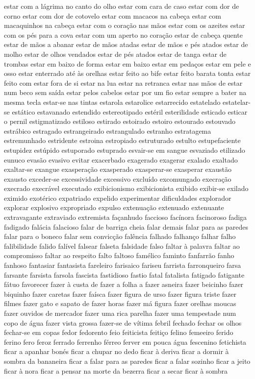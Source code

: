 \begin{appendices}
estar com a l\'{a}grima no canto do olho estar com cara de caso estar com dor de corno estar com dor de cotovelo estar com macacos na cabe\c{c}a estar com macaquinhos na cabe\c{c}a estar com o cora\c{c}\~ao nas m\~aos estar com os azeites estar com os p\'{e}s para a cova estar com um aperto no cora\c{c}\~ao estar de cabe\c{c}a quente estar de m\~aos a abanar estar de m\~aos atadas estar de m\~aos e p\'{e}s atados estar de molho estar de olhos vendados estar de p\'{e}s atados estar de tanga estar de trombas estar em baixo de forma estar em baixo estar em peda\c{c}os estar em pele e osso estar enterrado at\'{e} \`{a}s orelhas estar feito ao bife estar feito barata tonta estar feito com estar fora de si estar na lua estar na retranca estar nas m\~aos de estar num beco sem sa\'{i}da estar pelos cabelos estar por um fio estar sempre a bater na mesma tecla estar-se nas tintas estarola estarolice estarrecido estatelado estatelar-se est\'{a}tico estavanado estendido estereotipado est\'{e}ril esterilidade esticado esticar o pernil estigmatizado estiloso estirado estoirado estoiro estourado estouvado estr\'{a}bico estragado estrangeirado estrangulado estranho estratagema estremunhado estridente estroina estropiado estruturado estulto estupefaciente estupidez est\'{u}pido estuporado estuprado esvair-se em sangue esvaziado etilizado eunuco evas\~ao evasivo evitar exacerbado exagerado exagerar exalado exaltado exaltar-se exangue exaspera\c{c}\~ao exasperado exasperar-se exasperar exaust\~ao exausto exceder-se excessividade excessivo exclu\'{i}do excomungado execra\c{c}\~ao execrado execr\'{a}vel executado exibicionismo exibicionista exibido exibir-se exilado eximido exot\'{e}rico expatriado expelido experimentar dificuldades explorador explorar explosivo expropriado expulso extenua\c{c}\~ao extenuado extenuante extravagante extraviado extremista fa\c{c}anhudo faccioso fac\'{i}nora facinoroso fadiga fadigado fal\'{a}cia falacioso falar de barriga cheia falar demais falar para as paredes falar para o boneco falar sem convic\c{c}\~ao fal\^{e}ncia falhado falhan\c{c}o falhar falho falibilidade falido fal\'{i}vel falsear falseta falsidade falso faltar \`{a} palavra faltar ao compromisso faltar ao respeito falto faltoso fam\'{e}lico faminto fanfarr\~ao fanho fanhoso fantasiar fantasista fareleiro farisaico fariseu farrista farronqueiro farsa farsante farsista farsola fascista fastidioso fastio fatal fatalista fatigado fatigante f\'{a}tuo favorecer fazer \`{a} custa de fazer a folha a fazer asneira fazer beicinho fazer biquinho fazer caretas fazer fa\'{i}sca fazer figura de urso fazer figura triste fazer filmes fazer gato e sapato de fazer horas fazer m\'{a} figura fazer orelhas moucas fazer ouvidos de mercador fazer uma rica parelha fazer uma tempestade num copo de \'{a}gua fazer vista grossa fazer-se de v\'{i}tima febril fechado fechar os olhos fechar-se em copas fedor fedorento feio feiticista feiti\c{c}o felino femeeiro ferido ferino fero feroz ferrado ferrenho f\'{e}rreo ferver em pouca \'{a}gua fescenino fetichista ficar a apanhar bon\'{e}s ficar a chupar no dedo ficar \`{a} deriva ficar a dormir \`{a} sombra da bananeira ficar a falar para as paredes ficar a falar sozinho ficar a jeito ficar \`{a} nora ficar a pensar na morte da bezerra ficar a secar ficar \`{a} sombra 
\end{appendices}
